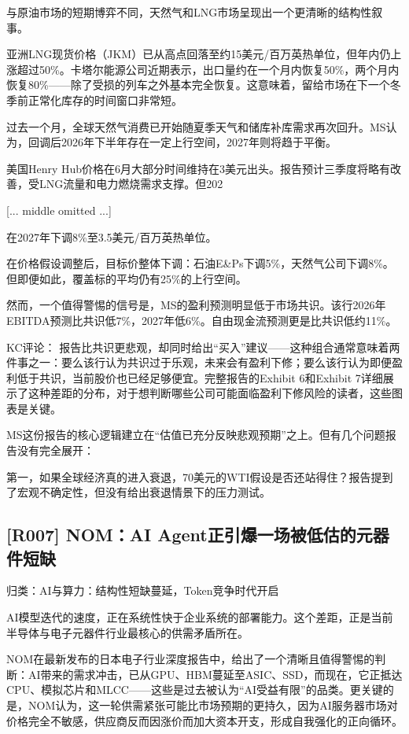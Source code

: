 \documentclass[11pt]{ctexart}
\begin{document}
与原油市场的短期博弈不同，天然气和LNG市场呈现出一个更清晰的结构性叙事。

亚洲LNG现货价格（JKM）已从高点回落至约15美元/百万英热单位，但年内仍上涨超过50\%。卡塔尔能源公司近期表示，出口量约在一个月内恢复50\%，两个月内恢复80\%——除了受损的列车之外基本完全恢复。这意味着，留给市场在下一个冬季前正常化库存的时间窗口非常短。

过去一个月，全球天然气消费已开始随夏季天气和储库补库需求再次回升。MS认为，回调后2026年下半年存在一定上行空间，2027年则将趋于平衡。

美国Henry Hub价格在6月大部分时间维持在3美元出头。报告预计三季度将略有改善，受LNG流量和电力燃烧需求支撑。但202

[... middle omitted ...]

在2027年下调8\%至3.5美元/百万英热单位。

在价格假设调整后，目标价整体下调：石油E\&Ps下调5\%，天然气公司下调8\%。但即便如此，覆盖标的平均仍有25\%的上行空间。

然而，一个值得警惕的信号是，MS的盈利预测明显低于市场共识。该行2026年EBITDA预测比共识低7\%，2027年低6\%。自由现金流预测更是比共识低约11\%。

KC评论： 报告比共识更悲观，却同时给出“买入”建议——这种组合通常意味着两件事之一：要么该行认为共识过于乐观，未来会有盈利下修；要么该行认为即便盈利低于共识，当前股价也已经足够便宜。完整报告的Exhibit 6和Exhibit 7详细展示了这种差距的分布，对于想判断哪些公司可能面临盈利下修风险的读者，这些图表是关键。

MS这份报告的核心逻辑建立在“估值已充分反映悲观预期”之上。但有几个问题报告没有完全展开：

第一，如果全球经济真的进入衰退，70美元的WTI假设是否还站得住？报告提到了宏观不确定性，但没有给出衰退情景下的压力测试。

\subsection{[R007] NOM：AI Agent正引爆一场被低估的元器件短缺}
{\small\color{refgray}归类：AI与算力：结构性短缺蔓延，Token竞争时代开启}

AI模型迭代的速度，正在系统性快于企业系统的部署能力。这个差距，正是当前半导体与电子元器件行业最核心的供需矛盾所在。

NOM在最新发布的日本电子行业深度报告中，给出了一个清晰且值得警惕的判断：AI带来的需求冲击，已从GPU、HBM蔓延至ASIC、SSD，而现在，它正抵达CPU、模拟芯片和MLCC——这些是过去被认为“AI受益有限”的品类。更关键的是，NOM认为，这一轮供需紧张可能比市场预期的更持久，因为AI服务器市场对价格完全不敏感，供应商反而因涨价而加大资本开支，形成自我强化的正向循环。
\end{document}
